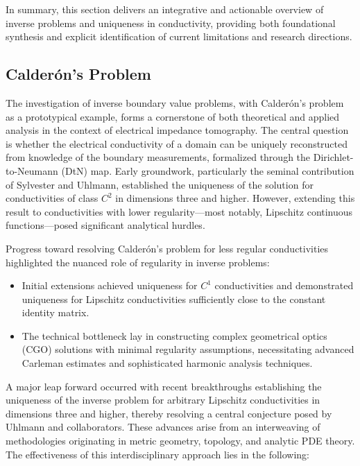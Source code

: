 \documentclass[sigconf]{acmart}
\begin{document}
In summary, this section delivers an integrative and actionable overview of inverse problems and uniqueness in conductivity, providing both foundational synthesis and explicit identification of current limitations and research directions.

\subsection{Calderón's Problem}

The investigation of inverse boundary value problems, with Calderón's problem as a prototypical example, forms a cornerstone of both theoretical and applied analysis in the context of electrical impedance tomography. The central question is whether the electrical conductivity of a domain can be uniquely reconstructed from knowledge of the boundary measurements, formalized through the Dirichlet-to-Neumann (DtN) map. Early groundwork, particularly the seminal contribution of Sylvester and Uhlmann, established the uniqueness of the solution for conductivities of class $C^2$ in dimensions three and higher. However, extending this result to conductivities with lower regularity---most notably, Lipschitz continuous functions---posed significant analytical hurdles.

Progress toward resolving Calderón's problem for less regular conductivities highlighted the nuanced role of regularity in inverse problems:

\begin{itemize}
    \item Initial extensions achieved uniqueness for $C^1$ conductivities and demonstrated uniqueness for Lipschitz conductivities sufficiently close to the constant identity matrix.
    \item The technical bottleneck lay in constructing complex geometrical optics (CGO) solutions with minimal regularity assumptions, necessitating advanced Carleman estimates and sophisticated harmonic analysis techniques.
\end{itemize}

A major leap forward occurred with recent breakthroughs establishing the uniqueness of the inverse problem for arbitrary Lipschitz conductivities in dimensions three and higher, thereby resolving a central conjecture posed by Uhlmann and collaborators. These advances arise from an interweaving of methodologies originating in metric geometry, topology, and analytic PDE theory. The effectiveness of this interdisciplinary approach lies in the following:
\end{document}
